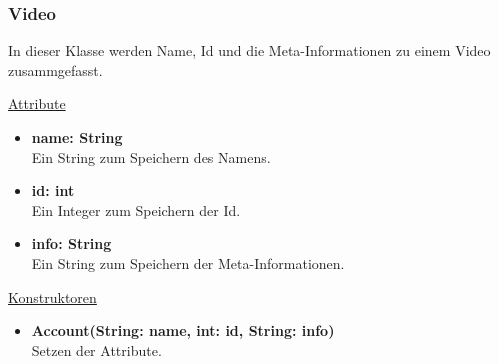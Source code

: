\newpage
\subsubsection{Video}\label{Video}
In dieser Klasse werden Name, Id und die Meta-Informationen zu einem Video zusammgefasst. \newline

\underline{Attribute}
\begin{itemize}
\itemsep0pt
\item \textbf{name: String} \hfill\\ 
Ein String zum Speichern des Namens.

\item \textbf{id: int} \hfill\\ 
Ein Integer zum Speichern der Id.

\item \textbf{info: String} \hfill\\ 
Ein String zum Speichern der Meta-Informationen.

\end{itemize}

\underline{Konstruktoren}
\begin{itemize}
\itemsep0pt
\item \textbf{Account(String: name, int: id, String: info)} \hfill\\
Setzen der Attribute.
\end{itemize}
